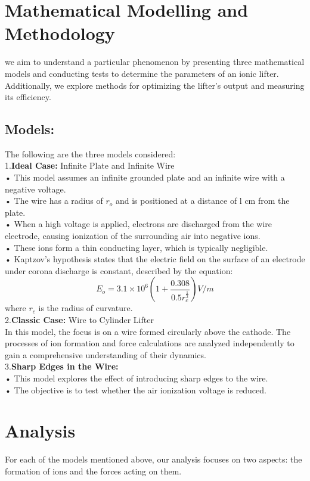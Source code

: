 \section*{Mathematical Modelling and Methodology}
\hspace{\parindent}we aim to understand a particular phenomenon by presenting three mathematical models and conducting tests to determine the parameters of an ionic lifter. Additionally, we explore methods for optimizing the lifter's output and measuring its efficiency.
\subsection*{Models:}
The following are the three models considered:\\
1.\textbf{Ideal Case:}	 Infinite Plate and Infinite Wire\\
•	This model assumes an infinite grounded plate and an infinite wire with a negative voltage.\\
•	The wire has a radius of $r_o$ and is positioned at a distance of l cm from the plate.\\
•	When a high voltage is applied, electrons are discharged from the wire electrode, causing ionization of the surrounding air into negative ions.\\
•	These ions form a thin conducting layer, which is typically negligible.\\
•	Kaptzov's hypothesis states that the electric field on the surface of an electrode under corona discharge is constant, described by the equation: 
$$E_o = 3.1\times10^6(1 + \frac{0.308}{0.5r_c ^\frac{1}{2}}) V/m$$
where $r_c$ is the radius of curvature.\cite{sakr1}\\
2.\textbf{Classic Case:}	 Wire to Cylinder Lifter\\
 \hspace{\parindent}  In this model, the focus is on a wire formed circularly above the cathode. The processes of ion formation and force calculations are analyzed independently to gain a comprehensive understanding of their dynamics.\\
3.\textbf{Sharp Edges in the Wire:}	\\
•	This model explores the effect of introducing sharp edges to the wire.\\
•	The objective is to test whether the air ionization voltage is reduced.\\
\newpage 
\section*{Analysis}
\hspace{\parindent}For each of the models mentioned above, our analysis focuses on two aspects: the formation of ions and the forces acting on them.
